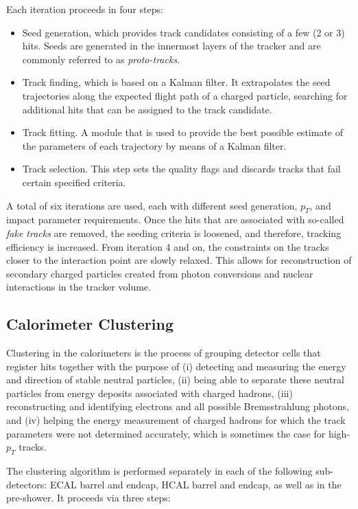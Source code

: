 Each iteration proceeds in four steps:

\begin{itemize}
	\item Seed generation, which provides track candidates consisting of a few (2 or 3) hits. Seeds are generated in the innermost layers of the tracker and are commonly referred to as \textit{proto-tracks}.
	\item Track finding, which is based on a Kalman filter. It extrapolates the seed trajectories along the expected flight path of a charged particle, searching for additional hits that can be assigned to the track candidate.
	\item Track fitting. A module that is used to provide the best possible estimate of the parameters of each trajectory by means of a Kalman filter.
	\item Track selection. This step sets the quality flags and discards tracks that fail certain specified criteria.
\end{itemize}

A total of six iterations are used, each with different seed generation, $p_{T}$, and impact parameter requirements. Once the hits that are associated with so-called \textit{fake tracks} are removed, the seeding criteria is loosened, and therefore, tracking efficiency is increased. From iteration 4 and on, the constraints on the tracks closer to the interaction point are slowly relaxed. This allows for reconstruction of secondary charged particles created from photon conversions and nuclear interactions in the tracker volume.

\subsection{Calorimeter Clustering}
Clustering in the calorimeters is the process of grouping detector cells that register hits together with the purpose of (i) detecting and measuring the energy and direction of stable neutral particles, (ii) being able to separate these neutral particles from energy deposits associated with charged hadrons, (iii) reconstructing and identifying electrons and all possible Bremsstrahlung photons, and (iv) helping the energy measurement of charged hadrons for which the track parameters were not determined accurately, which is sometimes the case for high-$p_{T}$ tracks.

The clustering algorithm is performed separately in each of the following sub-detectors: ECAL barrel and endcap, HCAL barrel and endcap, as well as in the pre-shower. It proceeds via three steps\cite{CMS:2009nxa}:

